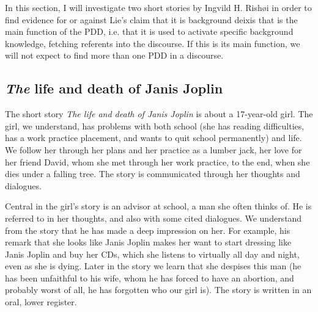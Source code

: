 \documentclass[output=paper,colorlinks,citecolor=brown]{langscibook}
\begin{document}
In this section, I will investigate two short stories by Ingvild H. Rishøi in order to find evidence for or against Lie’s claim that it is background deixis that is the main function of the PDD, i.e. that it is used to activate specific background knowledge, fetching referents into the discourse. If this is its main function, we will not expect to find more than one PDD in a discourse.

\subsection{\textit{The} life and death of Janis Joplin}\label{sec:johannessen:4.1}

The short story \textit{The life and death of Janis Joplin} \citep[183-206]{Rishoi2014} is about a 17-year-old girl. The girl, we understand, has problems with both school (she has reading difficulties, has a work practice placement, and wants to quit school permanently) and life. We follow her through her plans and her practice as a lumber jack, her love for her friend David, whom she met through her work practice, to the end, when she dies under a falling tree. The story is communicated through her thoughts and dialogues. 

Central in the girl’s story is an advisor at school, a man she often thinks of. He is referred to in her thoughts, and also with some cited dialogues. We understand from the story that he has made a deep impression on her. For example, his remark that she looks like Janis Joplin makes her want to start dressing like Janis Joplin and buy her CDs, which she listens to virtually all day and night, even as she is dying. Later in the story we learn that she despises this man (he has been unfaithful to his wife, whom he has forced to have an abortion, and probably worst of all, he has forgotten who our girl is). The story is written in an oral, lower register.
\end{document}
